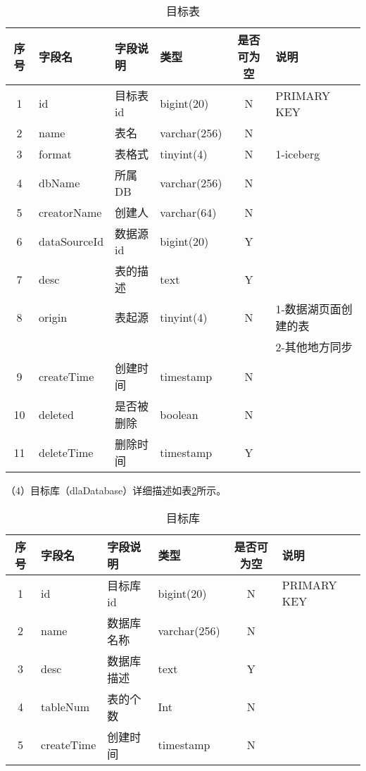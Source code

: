 \begin{table}[H]
  \centering
  \caption{目标表}
  \label{tab:目标表}
  \begin{tabular}{clllcl}
    \toprule
    序号  & 字段名              & 字段说明     & 类型           & 是否可为空   & 说明  \\
    \midrule
    1    & id                 & 目标表id     & bigint(20)    & N          & PRIMARY KEY    \\
    2    & name               & 表名         & varchar(256)  & N          &    \\
    3    & format             & 表格式       & tinyint(4)    & N          & 1-iceberg  \\
    4    & dbName             & 所属DB       & varchar(256)  & N          &   \\
    5    & creatorName        & 创建人       & varchar(64)   & N          &   \\
    6    & dataSourceId       & 数据源id     & bigint(20)           & Y          &   \\
    7    & desc               & 表的描述     & text           & Y          &   \\
    8    & origin             & 表起源       & tinyint(4)    & N          & 1-数据湖页面创建的表   \\
         &                    &             &               &            & 2-其他地方同步  \\
    9    & createTime         & 创建时间     & timestamp     & N          &    \\
    10   & deleted            & 是否被删除    & boolean     & N          &    \\
    11   & deleteTime         & 删除时间     & timestamp     & Y          &    \\
    \bottomrule
  \end{tabular}
\end{table}

（4）目标库（dlaDatabase）详细描述如表\ref{tab:目标库}所示。

\begin{table}[H]
  \centering
  \caption{目标库}
  \label{tab:目标库}
  \begin{tabular}{clllcl}
    \toprule
    序号  & 字段名              & 字段说明     & 类型           & 是否可为空   & 说明  \\
    \midrule
    1    & id                 & 目标库id     & bigint(20)    & N          & PRIMARY KEY    \\
    2    & name               & 数据库名称    & varchar(256)  & N          &    \\
    3    & desc               & 数据库描述    & text          & Y          &   \\
    4    & tableNum           & 表的个数      & Int           & N          &   \\
    5    & createTime         & 创建时间      & timestamp     & N          &   \\
    \bottomrule
  \end{tabular}
\end{table}


